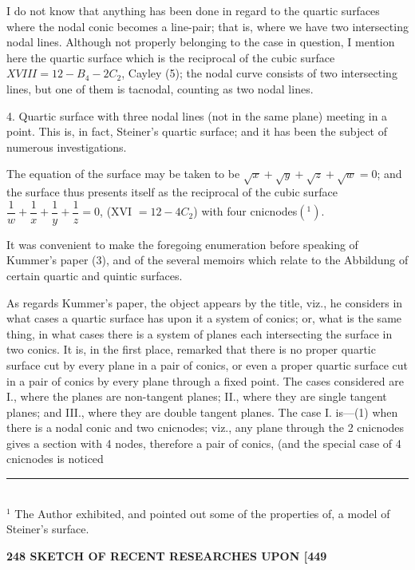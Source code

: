 \documentclass[11pt]{article}
\begin{document}
I do not know that anything has been done in regard to the quartic surfaces
where the nodal conic becomes a line-pair; that is, where we have two intersecting
nodal lines. Although not properly belonging to the case in question, I mention here
the quartic surface which is the reciprocal of the cubic surface $XVIII = 12 - B_4 - 2C_2$,
Cayley (5); the nodal curve consists of two intersecting lines, but one of them is
tacnodal, counting as two nodal lines.

4. Quartic surface with three nodal lines (not in the same plane) meeting in a
point. This is, in fact, Steiner's quartic surface; and it has been the subject of
numerous investigations.

The equation of the surface may be taken to be $\sqrt{x} + \sqrt{y} + \sqrt{z} + \sqrt{w} = 0$; and the
surface thus presents itself as the reciprocal of the cubic surface $\dfrac{1}{w} + \dfrac{1}{x} + \dfrac{1}{y} + \dfrac{1}{z} = 0$,
(XVI $= 12 - 4 C_2$) with four cnicnodes$(^1)$.

It was convenient to make the foregoing enumeration before speaking of Kummer's
paper (3), and of the several memoirs which relate to the Abbildung of certain quartic
and quintic surfaces.

As regards Kummer's paper, the object appears by the title, viz., he considers in
what cases a quartic surface has upon it a system of conics; or, what is the same
thing, in what cases there is a system of planes each intersecting the surface in two
conics. It is, in the first place, remarked that there is no proper quartic surface cut
by every plane in a pair of conics, or even a proper quartic surface cut in a pair of
conics by every plane through a fixed point. The cases considered are I., where the
planes are non-tangent planes; II., where they are single tangent planes; and III.,
where they are double tangent planes. The case I. is---(1) when there is a nodal conic
and two cnicnodes; viz., any plane through the 2 cnicnodes gives a section with 4
nodes, therefore a pair of conics, (and the special case of 4 cnicnodes is noticed

\vfill
\noindent\rule{2cm}{0.4pt}\\
\footnotesize $^{1}$ The Author exhibited, and pointed out some of the properties of, a model of Steiner's surface.
\normalsize

\medskip
\noindent\textbf{248 \hfill SKETCH OF RECENT RESEARCHES UPON \hfill [449}

\medskip
\end{document}
